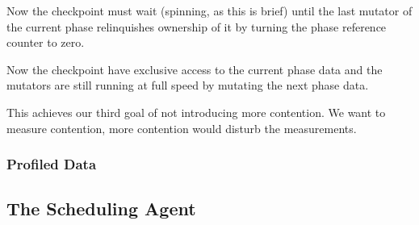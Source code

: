 Now the checkpoint must wait (spinning, as this is brief) until the last mutator of the current phase relinquishes ownership of it by turning the phase reference counter to zero.

Now the checkpoint have exclusive access to the current phase data and the mutators are still running at full speed by mutating the next phase data.

This achieves our third goal of not introducing more contention. We want to measure contention, more contention would disturb the measurements.

\subsubsection{Profiled Data} \label{sec:agentprof}


\subsection{The Scheduling Agent}


\fi


